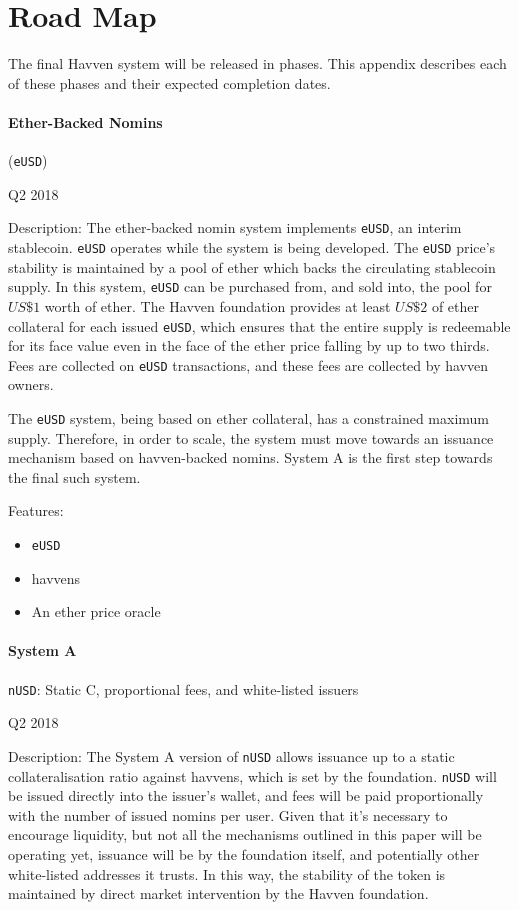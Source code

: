 \section{Road Map}

The final Havven system will be released in phases. This appendix describes
each of these phases and their expected completion dates.

\paragraph{Ether-Backed Nomins} (\texttt{eUSD})

Q2 2018

Description:
The ether-backed nomin system implements \texttt{eUSD}, an interim stablecoin.
\texttt{eUSD} operates while the system is being developed.
The \texttt{eUSD} price's stability is maintained by a pool of ether which
backs the circulating stablecoin supply. In this system, \texttt{eUSD} can be
purchased from, and sold into, the pool for \(US\$1\) worth of ether.
The Havven foundation provides at least \(US\$2\) of ether collateral for each
issued \texttt{eUSD}, which ensures that the entire supply is redeemable for its
face value even in the face of the ether price falling by up to two thirds.
Fees are collected on \texttt{eUSD} transactions, and these fees are collected
by havven owners.

The \texttt{eUSD} system, being based on ether collateral, has a constrained maximum supply.
Therefore, in order to scale, the system must move towards an issuance mechanism based on havven-backed
nomins. System A is the first step towards the final such system.

Features:
\begin{itemize}
    \item{\texttt{eUSD}}
    \item{havvens}
    \item{An ether price oracle}
\end{itemize}


\paragraph{System A} \texttt{nUSD}: Static C, proportional fees, and white-listed issuers

Q2 2018

Description:
The System A version of \texttt{nUSD} allows issuance up to a static
collateralisation ratio against havvens, which is set by the foundation.
\texttt{nUSD} will be issued directly into the issuer's wallet, and fees will be paid
proportionally with the number of issued nomins per user. Given that it's necessary to
encourage liquidity, but not all the mechanisms outlined in this paper will be operating
yet, issuance will be by the foundation itself, and potentially other white-listed
addresses it trusts. In this way, the stability of the token is maintained by direct
market intervention by the Havven foundation.

